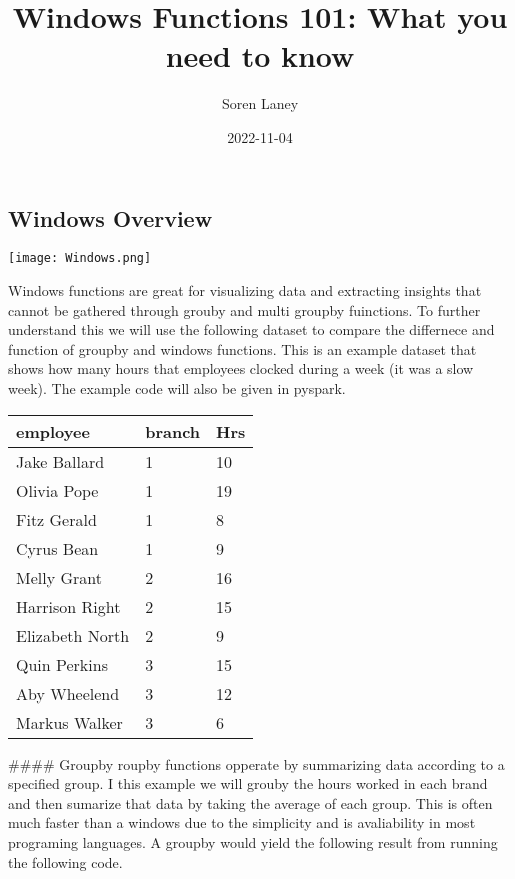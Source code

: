 \documentclass[
  letterpaper,
  DIV=11,
  numbers=noendperiod]{scrartcl}
\title{Windows Functions 101: What you need to know}
\author{Soren Laney}
\date{2022-11-04}
\begin{document}
\maketitle
\ifdefined\Shaded\renewenvironment{Shaded}{\begin{tcolorbox}[enhanced, frame hidden, borderline west={3pt}{0pt}{shadecolor}, interior hidden, boxrule=0pt, breakable, sharp corners]}{\end{tcolorbox}}\fi

\hypertarget{windows-overview}{%
\subsection{Windows Overview}\label{windows-overview}}

\texttt{[image: Windows.png]}

Windows functions are great for visualizing data and extracting insights
that cannot be gathered through grouby and multi groupby fuinctions. To
further understand this we will use the following dataset to compare the
differnece and function of groupby and windows functions. This is an
example dataset that shows how many hours that employees clocked during
a week (it was a slow week). The example code will also be given in
pyspark.

\begin{longtable}[]{@{}lll@{}}
\toprule()
employee & branch & Hrs \\
\midrule()
\endhead
Jake Ballard & 1 & 10 \\
Olivia Pope & 1 & 19 \\
Fitz Gerald & 1 & 8 \\
Cyrus Bean & 1 & 9 \\
Melly Grant & 2 & 16 \\
Harrison Right & 2 & 15 \\
Elizabeth North & 2 & 9 \\
Quin Perkins & 3 & 15 \\
Aby Wheelend & 3 & 12 \\
Markus Walker & 3 & 6 \\
\bottomrule()
\end{longtable}

\#\#\#\# Groupby roupby functions opperate by summarizing data according
to a specified group. I this example we will grouby the hours worked in
each brand and then sumarize that data by taking the average of each
group. This is often much faster than a windows due to the simplicity
and is avaliability in most programing languages. A groupby would yield
the following result from running the following code.
\end{document}
